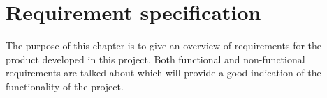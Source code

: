 \chapter{Requirement specification}
\label {sec:recSpecification}

The purpose of this chapter is to give an overview of requirements for the product developed in this project.
Both functional and non-functional requirements are talked about which will provide a good indication of the functionality of the project.

\newpage





